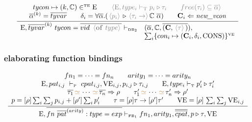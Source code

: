\documentclass[11pt,a4paper]{article}
\newcommand{\key}[1]{\textrm{\textbf{#1}}}
\newcommand{\qualtype}[2]{#1 \triangleright #2}
\newcommand{\unifylist}[3]{#1\,{\color{brown}{\simeq}}\,\cdots\,{\color{brown}{\simeq}}\,#2 \Rightarrow #3}
\newcommand{\subst}[2]{[#1]\,#2}
\newcommand{\braced}[1]{\{#1\}}
\newcommand{\angled}[1]{\,{\color{gray}\langle#1\rangle}\,}
\newcommand{\Type} {\textrm{T}}
\newcommand{\Env}  {\textrm{E}}
\newcommand{\VE}   {\textrm{VE}}
\newcommand{\sType} {\textrm{\tiny T}}
\newcommand{\sVE}   {\textrm{\tiny VE}}
\newcommand{\sTE}   {\textrm{\tiny TE}}
\newcommand{\sDB}   {\textrm{\tiny DB}}
\newcommand{\sFB}   {\textrm{\tiny FB}}
\newcommand{\VKC}  {\textrm{CONS}}
\newcommand{\tycon}{\mathbb{C}}
\newcommand{\vcon} {\mathbf{C}}
\newcommand{\vdashP}  {\ \vdash_{\textrm{\tiny P}}\  }
\newcommand{\corenew}[1]{\textit{new\_#1}}
\newcommand{\vect}[1]{\overline{#1}}
\begin{document}
\[
\cfrac
 {\begin{array}{c}
  tycon \mapsto (k,\tycon) \in^\sTE \Env 	                \qquad 
  \angled{\Env,type_i \vdash_\Type \qualtype{p_i}{\tau_i} 	\qquad
  free(\tau_i) \subseteq \vect{\alpha}}                 \\
  \vect\alpha^{(k)} = \vect{tyvar}						\qquad
  \delta_i = \forall{\vect\alpha}.
    (\qualtype{\angled{p_i}}{\angled{\tau_i \to }\tycon\ \vect\alpha}) \qquad
  \vcon_i\Leftarrow\corenew{vcon}			                \\
  \end{array} }
 {\begin{array}{ll}
  \Env,\vect{tyvar}^{(k)}\ tycon = \vect{vid\ \angled{\key{of}\ type}} \vdash_{\sDB_2} 
  & (\vect\alpha, \tycon, \vect{(\vcon,\angled{\tau})}), \\
  & \sum_i\braced{con_i \mapsto (\vcon_i,\delta_i,\VKC)}^\sVE \\
  \end{array}}
\]

\subsubsection{elaborating function bindings}
\[
\cfrac
 {\begin{array}{c}
  fn_1=\cdots=fn_n \qquad arity_1=\cdots=arity_n                                \\
  \Env,pat_{i,j}  \vdashP  cpat_{i,j},\VE_{i,j},\qualtype{p_{i,j}}{\tau_{i,j}}  \qquad
  \Env,type_i \vdash_\sType \qualtype{p_i'}{\tau_i'}                            \\
  \unifylist{\vect{\tau_1}}{\vect{\tau_n}}{\rho}                                \qquad
  \unifylist{\tau_1'}{\tau_n'}{\rho'}                                           \\
  p = [\rho]\sum_i\sum_j p_{i,j} + [\rho']\sum_i p_i' \qquad
  \tau = [\rho]\tau\to[\rho']\tau'          \qquad
  \VE = \subst{\rho}{\sum_i \sum_j \VE_{i,j}}
  \end{array}}
 {\Env, \vect{fn\ \vect{pat}^{(arity)}:type = exp} \vdash_{\sFB_1} 
  fn_1, arity_1, \vect{\vect{cpat}},\qualtype{p}{\tau},\VE}
\]
\end{document}
